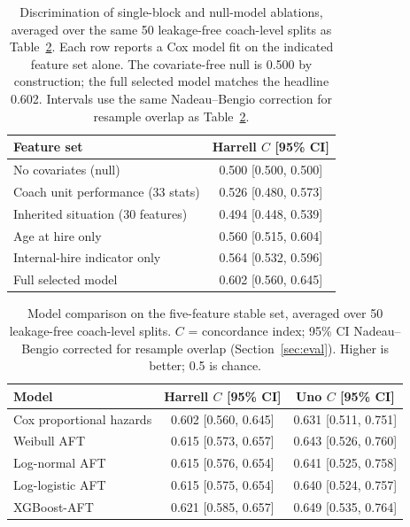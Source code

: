 \documentclass[12pt,USenglish]{article}
\begin{document}
\begin{table}[!ht]
\caption{Discrimination of single-block and null-model ablations, averaged over the same 50 leakage-free coach-level splits as Table~\ref{tab:bakeoff}. Each row reports a Cox model fit on the indicated feature set alone. The covariate-free null is 0.500 by construction; the full selected model matches the headline 0.602. Intervals use the same Nadeau--Bengio correction for resample overlap as Table~\ref{tab:bakeoff}.}
\label{tab:ablation}
\small
\begin{tabular}{lc}
\toprule
Feature set & Harrell $C$ [95\% CI] \\
\midrule
No covariates (null) & 0.500 [0.500, 0.500] \\
Coach unit performance (33 stats) & 0.526 [0.480, 0.573] \\
Inherited situation (30 features) & 0.494 [0.448, 0.539] \\
Age at hire only & 0.560 [0.515, 0.604] \\
Internal-hire indicator only & 0.564 [0.532, 0.596] \\
Full selected model & 0.602 [0.560, 0.645] \\
\bottomrule
\end{tabular}
\end{table}

\begin{table}[!ht]
\caption{Model comparison on the five-feature stable set, averaged over 50 leakage-free coach-level splits. $C$ = concordance index; 95\% CI Nadeau--Bengio corrected for resample overlap (Section~\ref{sec:eval}). Higher is better; 0.5 is chance.}
\label{tab:bakeoff}
\small
\begin{tabular}{lcc}
\toprule
Model & Harrell $C$ [95\% CI] & Uno $C$ [95\% CI] \\
\midrule
Cox proportional hazards & 0.602 [0.560, 0.645] & 0.631 [0.511, 0.751] \\
Weibull AFT & 0.615 [0.573, 0.657] & 0.643 [0.526, 0.760] \\
Log-normal AFT & 0.615 [0.576, 0.654] & 0.641 [0.525, 0.758] \\
Log-logistic AFT & 0.615 [0.575, 0.654] & 0.640 [0.524, 0.757] \\
XGBoost-AFT & 0.621 [0.585, 0.657] & 0.649 [0.535, 0.764] \\
\bottomrule
\end{tabular}
\end{table}
\end{document}
